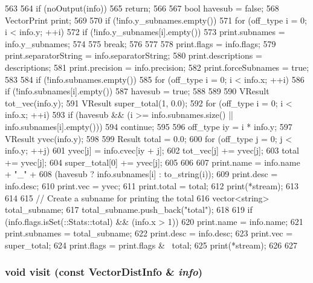 \begin{DoxyCode}
563 {
564     if (noOutput(info))
565         return;
566 
567     bool havesub = false;
568     VectorPrint print;
569 
570     if (!info.y_subnames.empty()) {
571         for (off_type i = 0; i < info.y; ++i) {
572             if (!info.y_subnames[i].empty()) {
573                 print.subnames = info.y_subnames;
574             }
575             break;
576         }
577     }
578     print.flags = info.flags;
579     print.separatorString = info.separatorString;
580     print.descriptions = descriptions;
581     print.precision = info.precision;
582     print.forceSubnames = true;
583 
584     if (!info.subnames.empty()) {
585         for (off_type i = 0; i < info.x; ++i)
586             if (!info.subnames[i].empty())
587                 havesub = true;
588     }
589 
590     VResult tot_vec(info.y);
591     VResult super_total(1, 0.0);
592     for (off_type i = 0; i < info.x; ++i) {
593         if (havesub && (i >= info.subnames.size() || info.subnames[i].empty()))
594             continue;
595 
596         off_type iy = i * info.y;
597         VResult yvec(info.y);
598 
599         Result total = 0.0;
600         for (off_type j = 0; j < info.y; ++j) {
601             yvec[j] = info.cvec[iy + j];
602             tot_vec[j] += yvec[j];
603             total += yvec[j];
604             super_total[0] += yvec[j];
605         }
606 
607         print.name = info.name + "_" +
608             (havesub ? info.subnames[i] : to_string(i));
609         print.desc = info.desc;
610         print.vec = yvec;
611         print.total = total;
612         print(*stream);
613     }
614 
615     // Create a subname for printing the total
616     vector<string> total_subname;
617     total_subname.push_back("total");
618 
619     if (info.flags.isSet(::Stats::total) && (info.x > 1)) {
620         print.name = info.name;
621         print.subnames = total_subname;
622         print.desc = info.desc;
623         print.vec = super_total;
624         print.flags = print.flags & ~total;
625         print(*stream);
626     }
627 }
\end{DoxyCode}
\hypertarget{classStats_1_1Text_a1d1e4614088a11f07d9ca033802d4d77}{
\subsubsection[{visit}]{\setlength{\rightskip}{0pt plus 5cm}void visit (const {\bf VectorDistInfo} \& {\em info})}}
\label{classStats_1_1Text_a1d1e4614088a11f07d9ca033802d4d77}


